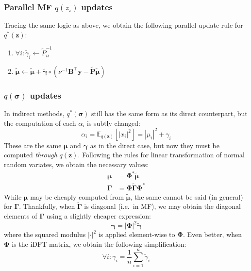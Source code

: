 \documentclass{article}
\newcommand{\m}[1]{\boldsymbol{#1}}
\newcommand{\E}[2]{\mathbb{E}_{#2}\left[ #1 \right]}
\begin{document}
\subsubsection{Parallel MF $q(z_i)$ updates}
Tracing the same logic as above, we obtain the following parallel update
rule for $q^*(\m{z})$:
\begin{enumerate}
 \item $\forall i : \tilde\gamma_i \gets \tilde{P}_{ii}^{-1}$
 \item $\m{\tilde\mu} \gets \m{\tilde\mu} + \m{\tilde\gamma} \circ \left(
         \nu^{-1} \m{B}^\top \m{y} - \m{\tilde P} \m{\tilde\mu}
        \right)$
\begin{equation*}
\end{equation*}
\end{enumerate}

\subsubsection{$q(\m{\sigma})$ updates}
In indirect methods, $q^*(\m{\sigma})$ still has the same form as its
direct counterpart, but the computation of each $\alpha_i$ is
subtly changed:
\begin{equation*}
\alpha_i = \E{|x_i|^2}{q(\m{z})} = |\mu_i|^2 + \gamma_i
\end{equation*}
These are the same $\m{\mu}$ and $\m{\gamma}$ as in the direct case, but
now they must be computed \emph{through} $q(\m{z})$. Following the rules
for linear transformation of normal random variates, we obtain the
necessary values:
\begin{equation*}
\begin{aligned}
\m{\mu} &= \m{\Phi}^* \m{\tilde\mu}
\\
\m{\Gamma} &= \m{\Phi} \m{\tilde\Gamma} \m{\Phi}^*
\end{aligned}
\end{equation*}
While $\m{\mu}$ may be cheaply computed from $\m{\tilde\mu}$, the same
cannot be said (in general) for $\m{\Gamma}$. Thankfully, when
$\m{\tilde\Gamma}$ is diagonal (i.e.~in MF), we may obtain the
diagonal elements of $\m{\Gamma}$ using a slightly cheaper
expression:
\begin{equation*}
\m{\gamma} = \left| \m{\Phi} \right|^2 \m{\tilde\gamma}
\end{equation*}
where the squared modulus $|\cdot|^2$ is applied element-wise to
$\m{\Phi}$. Even better, when $\m{\Phi}$ is the iDFT matrix, we
obtain the following simplification:
\begin{equation*}
\forall i : \gamma_i = \frac{1}{n} \sum_{i=1}^n \tilde\gamma_i
\end{equation*}
\end{document}
